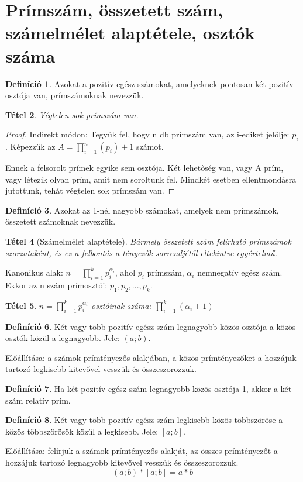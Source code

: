 \documentclass[twoside,12pt]{report}
\newtheorem{theorem}{Tétel}[section]
\theoremstyle{definition}
\newtheorem{definition}[theorem]{Definíció}
\begin{document}
\section{Prímszám, összetett szám, számelmélet alaptétele, osztók száma}
	\begin{definition}
		Azokat a pozitív egész számokat, amelyeknek pontosan két pozitív osztója van, prímszámoknak nevezzük.
	\end{definition}
	\begin{theorem}
		Végtelen sok prímszám van.
	\end{theorem}
	\begin{proof}
		Indirekt módon: Tegyük fel, hogy n db prímszám van, az i-ediket jelölje: $p_i$. Képezzük az $A=\prod_{i=1}^{n} (p_i)+1$ számot.
		
		Ennek a felsorolt prímek egyike sem osztója. Két lehetőség van, vagy A prím, vagy létezik olyan prím, amit nem soroltunk fel. Mindkét esetben ellentmondásra jutottunk, tehát végtelen sok prímszám van.
	\end{proof}
	\begin{definition}
		Azokat az 1-nél nagyobb számokat, amelyek nem prímszámok, összetett számoknak
		nevezzük.
	\end{definition}
	\begin{theorem}[Számelmélet alaptétele]
		Bármely összetett szám felírható prímszámok szorzataként, és ez a felbontás a tényezők sorrendjétől eltekintve egyértelmű.
	\end{theorem}
	Kanonikus alak: $n=\prod_{i=1}^{k}p_i^{\alpha_i}$, ahol $p_i$ prímszám, $\alpha_i$ nemnegatív egész szám. Ekkor az n szám prímosztói: $p_1,p_2,...,p_k$.
	\begin{theorem}
		$n=\prod_{i=1}^{k}p_i^{\alpha_i}$ osztóinak száma: $\prod_{i=1}^{k}(\alpha_i+1)$
	\end{theorem}
	\begin{definition}
		Két vagy több pozitív egész szám legnagyobb közös osztója a közös osztók közül a legnagyobb. Jele: $(a; b)$.
	\end{definition}
	Előállítása: a számok prímtényezős alakjában, a közös prímtényezőket a hozzájuk tartozó legkisebb kitevővel vesszük és összeszorozzuk.
	\begin{definition}
		Ha két pozitív egész szám legnagyobb közös osztója 1, akkor a két szám relatív prím.
	\end{definition}
	\begin{definition}
		Két vagy több pozitív egész szám legkisebb közös többszöröse a közös többszörösök
		közül a legkisebb. Jele: $[a; b]$.
	\end{definition}
	Előállítása: felírjuk a számok prímtényezős alakját, az összes prímtényezőt	a hozzájuk tartozó legnagyobb kitevővel vesszük és összeszorozzuk.
	\begin{equation*}
		(a;b)*[a;b]=a*b
	\end{equation*}
\end{document}
